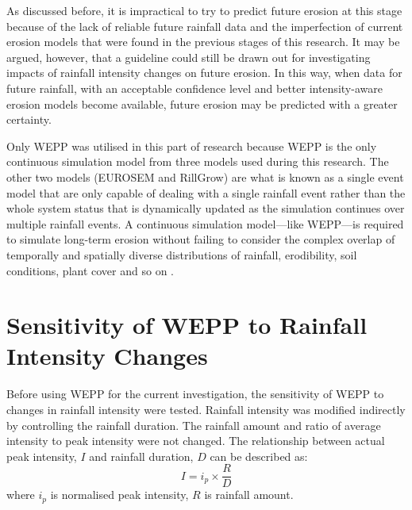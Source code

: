 As discussed before, it is impractical to try to predict future erosion at this
stage because of the lack of reliable future rainfall data and the imperfection
of current erosion models that were found in the previous stages of this
research. It may be argued, however, that a guideline could still be drawn out
for investigating impacts of rainfall intensity changes on future erosion. In
this way, when data for future rainfall, with an acceptable confidence level and
better intensity-aware erosion models become available, future erosion may be
predicted with a greater certainty.

Only WEPP was utilised in this part of research because WEPP is the only
continuous simulation model from three models used during this research. The
other two models (EUROSEM and RillGrow) are what is known as a single event
model that are only capable of dealing with a single rainfall event rather than
the whole system status that is dynamically updated as the simulation continues
over multiple rainfall events. A continuous simulation model---like WEPP---is
required to simulate long-term erosion without failing to consider the complex
overlap of temporally and spatially diverse distributions of rainfall,
erodibility, soil conditions, plant cover and so on \citep{nearing2006-145}.






\section{Sensitivity of WEPP to Rainfall Intensity Changes}
\label{sec:MethodsSensitivityOfCLIGENToRainfallIntensityChanges}

Before using WEPP for the current investigation, the sensitivity of WEPP to
changes in rainfall intensity were tested. Rainfall intensity was modified
indirectly by controlling the rainfall duration. The rainfall amount and ratio
of average intensity to peak intensity were not changed. The relationship
between actual peak intensity, $I$ and rainfall duration, $D$ can be described
as:
\begin{equation}
\label{eq:ActualIntensity}
  I = i_p \times \frac{R}{D}
\end{equation}
where $i_p$ is normalised peak intensity, $R$ is rainfall amount.

